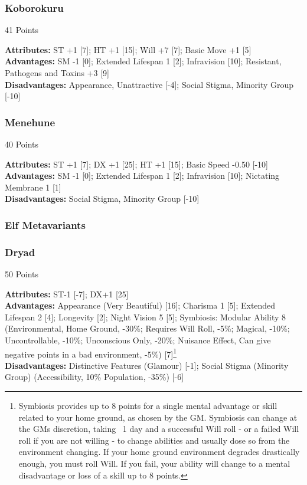\begin{multicols*}{3}
	\subsubsection*{Koborokuru}
	\begin{flushright}
		41 Points
	\end{flushright}
	\textbf{Attributes:}
	ST +1 [7]; HT +1 [15]; Will +7 [7]; Basic Move +1 [5]
	\textbf{Advantages:}
	SM -1 [0]; Extended Lifespan 1 [2]; Infravision [10]; Resistant, Pathogens and Toxins +3 [9]
	\\\textbf{Disadvantages:} 
	Appearance, Unattractive [-4]; Social Stigma, Minority Group [-10]
	
	\subsubsection*{Menehune}
	\begin{flushright}
		40 Points
	\end{flushright}
	\textbf{Attributes:}
	ST +1 [7]; DX +1 [25]; HT +1 [15]; Basic Speed -0.50 [-10]
	\textbf{Advantages:}
	SM -1 [0]; Extended Lifespan 1 [2]; Infravision [10]; Nictating Membrane 1 [1]
	\\\textbf{Disadvantages:} 
	Social Stigma, Minority Group [-10]
	
	\subsubsection{Elf Metavariants}
	
	\subsubsection*{Dryad}
	\begin{flushright}
		50 Points
	\end{flushright}
	\textbf{Attributes:} 
	ST-1 [-7]; DX+1 [25]
	\\\textbf{Advantages:} 
	Appearance (Very Beautiful) [16]; Charisma 1 [5]; Extended Lifespan 2 [4]; Longevity [2]; Night Vision 5 [5]; Symbiosis: Modular Ability 8 (Environmental, Home Ground, -30\%; Requires Will Roll, -5\%; Magical, -10\%; Uncontrollable, -10\%; Unconscious Only, -20\%; Nuisance Effect, Can give negative points in a bad environment, -5\%) [7]\footnote{Symbiosis provides up to 8 points for a single mental advantage or skill related to your home ground, as chosen by the GM. Symbiosis can change at the GMs discretion, taking ~1 day and a successful Will roll - or a failed Will roll if you are not willing - to change abilities and usually dose so from the environment changing. If your home ground environment degrades drastically enough, you must roll Will. If you fail, your ability will change to a mental disadvantage or loss of a skill up to 8 points.}
	\\\textbf{Disadvantages:} 
	Distinctive Features (Glamour) [-1]; Social Stigma (Minority Group) (Accessibility, 10\% Population, -35\%) [-6]
	

\end{multicols*}
